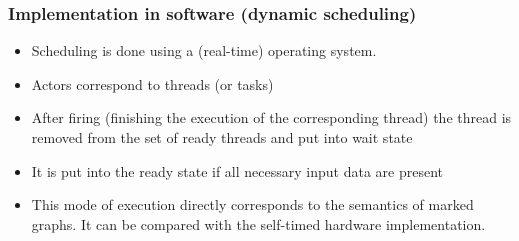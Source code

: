 \subsubsection{Implementation in software (dynamic scheduling)}

\begin{itemize}[noitemsep]
\item Scheduling is done using a (real-time) operating system.
\item Actors correspond to threads (or tasks)
\item After firing (finishing the execution of the corresponding thread) the thread is removed from the set of ready threads and put into wait state
\item It is put into the ready state if all necessary input data are present
\item This mode of execution directly corresponds to the semantics of marked graphs. It can be compared with the self-timed hardware implementation. 
\end{itemize}

\cleardoublepage

